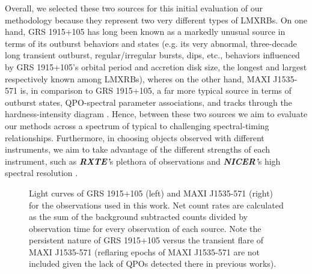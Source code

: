 \documentclass[fleqn,usenatbib,twocolumn]{mnras}%
\begin{document}
Overall, we selected these two sources for this initial evaluation of our methodology because they represent two very different types of LMXRBs. On one hand, GRS 1915+105 has long been known as a markedly unusual source in terms of its outburst behaviors and states (e.g. its very abnormal, three-decade long transient outburst, regular/irregular bursts, dips, etc., behaviors influenced by GRS 1915+105's orbital period and accretion disk size, the longest and largest respectively known among LMXRBs), wheres on the other hand, MAXI J1535-571 is, in comparison to GRS 1915+105, a far more typical source in terms of outburst states, QPO-spectral parameter associations, and tracks through the hardness-intensity diagram \citep{Taam1996,Truss2006,Nakahira2018,Bhargava2019,cuneo2020,Koljonen2021,garciaGRS2022MNRAS}. Hence, between these two sources we aim to evaluate our methods across a spectrum of typical to challenging spectral-timing relationships. Furthermore, in choosing objects observed with different instruments, we aim to take advantage of the different strengths of each instrument, such as \textbf{\textit{RXTE'}}s plethora of observations and \textbf{\textit{NICER'}}s high spectral resolution \citep{NICER}.


\begin{figure*}
    \centering
{}\textwidth{figures/figure_1/GRS_lightcurve.pdf}
\textwidth{figures/figure_1/MAXI_lightcurve.pdf}
    \caption{Light curves of GRS 1915+105 (left) and MAXI J1535-571 (right) for the observations used in this work. Net count rates are calculated as the sum of the background subtracted counts divided by observation time for every observation of each source. Note the persistent nature of GRS 1915+105 versus the transient flare of MAXI J1535-571 (reflaring epochs of MAXI J1535-571 are not included given the lack of QPOs detected there in previous works).}
    \label{fig:lightcurve}
\end{figure*}
\end{document}
